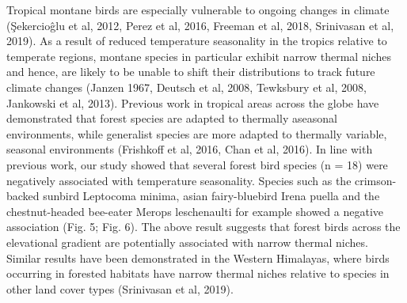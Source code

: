 Tropical montane birds are especially vulnerable to ongoing changes in climate (Şekercioĝlu et al, 2012, Perez et al, 2016, Freeman et al, 2018, Srinivasan et al, 2019).
As a result of reduced temperature seasonality in the tropics relative to temperate regions, montane species in particular exhibit narrow thermal niches and hence, are likely to be unable to shift their distributions to track future climate changes (Janzen 1967, Deutsch et al, 2008, Tewksbury et al, 2008, Jankowski et al, 2013).
Previous work in tropical areas across the globe have demonstrated that forest species are adapted to thermally aseasonal environments, while generalist species are more adapted to thermally variable, seasonal environments (Frishkoff et al, 2016, Chan et al, 2016).
In line with previous work, our study showed that several forest bird species (n = 18) were negatively associated with temperature seasonality.
Species such as the crimson-backed sunbird Leptocoma minima, asian fairy-bluebird Irena puella and the chestnut-headed bee-eater Merops leschenaulti for example showed a negative association (Fig. 5; Fig. 6).
The above result suggests that forest birds across the elevational gradient are potentially associated with narrow thermal niches.
Similar results have been demonstrated in the Western Himalayas, where birds occurring in forested habitats have narrow thermal niches relative to species in other land cover types (Srinivasan et al, 2019).

